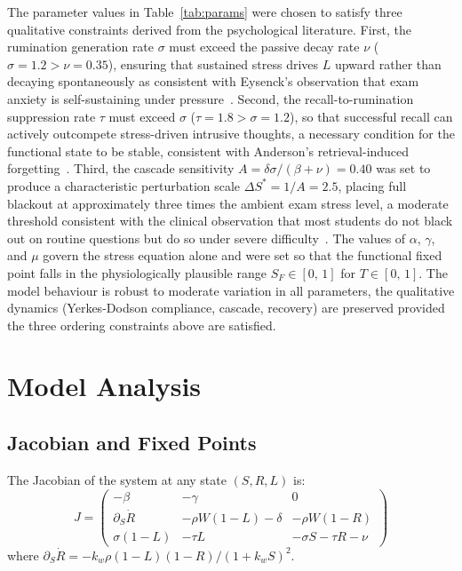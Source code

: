 The parameter values in Table~\ref{tab:params} were chosen to satisfy
three qualitative constraints derived from the psychological literature.
First, the rumination generation rate $\sigma$ must exceed the passive
decay rate $\nu$ ($\sigma=1.2 > \nu=0.35$), ensuring that sustained
stress drives $L$ upward rather than decaying spontaneously as consistent
with Eysenck's observation that exam anxiety is self-sustaining under
pressure~\cite{eysenck2007}. Second, the recall-to-rumination
suppression rate $\tau$ must exceed $\sigma$ ($\tau=1.8 > \sigma=1.2$),
so that successful recall can actively outcompete stress-driven
intrusive thoughts, a necessary condition for the functional state to
be stable, consistent with Anderson's retrieval-induced
forgetting~\cite{anderson2003}. Third, the cascade sensitivity
$A=\delta\sigma/(\beta+\nu)=0.40$ was set to produce a characteristic
perturbation scale $\Delta S^*=1/A=2.5$, placing full blackout at
approximately three times the ambient exam stress level, a moderate
threshold consistent with the clinical observation that most students
do not black out on routine questions but do so under severe
difficulty~\cite{eysenck2007}. The values of $\alpha$, $\gamma$, and
$\mu$ govern the stress equation alone and were set so that the
functional fixed point falls in the physiologically plausible range
$S_F\in[0,\,1]$ for $T\in[0,\,1]$. The model behaviour is robust to
moderate variation in all parameters, the qualitative dynamics
(Yerkes-Dodson compliance, cascade, recovery) are preserved provided
the three ordering constraints above are satisfied.

\section{Model Analysis}
\label{sec:analysis}

\subsection{Jacobian and Fixed Points}

The Jacobian of the system at any state $(S,R,L)$ is:
\begin{equation}
  J =
  \begin{pmatrix}
    {-\beta} & {-\gamma} & 0 \\[4pt]
    {\scriptstyle\partial_S\dot{R}} &
    {-\rho W(1-L) - \delta} &
    {-\rho W(1-R)} \\[6pt]
    {\sigma(1-L)} & {-\tau L} & {-\sigma S - \tau R - \nu}
  \end{pmatrix}
  \label{eq:jacobian}
\end{equation}
where $\partial_S\dot{R} =
-k_w\rho(1-L)(1-R)/(1+k_wS)^2$.

